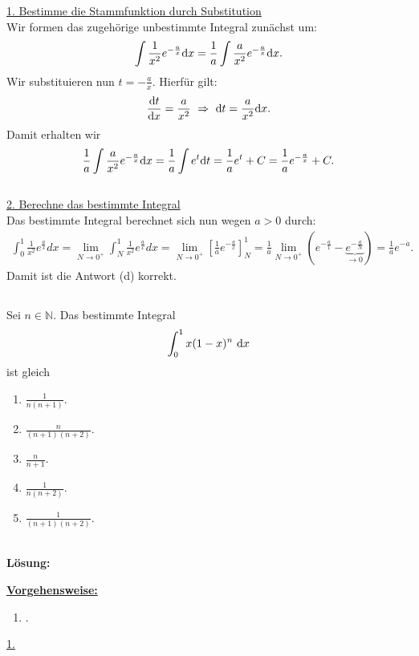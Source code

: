 \underline{1. Bestimme die Stammfunktion durch Substitution}\\
Wir formen das zugehörige unbestimmte Integral zunächst um:
\begin{align*}
	\int \frac{1}{x^2} e^{-\frac{a}{x}} \text{\rmfamily d} x
	=
	\frac{1}{a} \int \frac{a}{x^2} e^{-\frac{a}{x}} \text{\rmfamily d} x.
\end{align*}
Wir substituieren nun $ t = -\frac{a}{x} $. Hierfür gilt:
\begin{align*}
	\frac{\td{t}}{\td{x}} = \frac{a}{x^2} \ \Rightarrow
	\ 
	\td{t} =\frac{a}{x^2} \td{x} .
\end{align*}
Damit erhalten wir
\begin{align*}
	\frac{1}{a} \int \frac{a}{x^2} e^{-\frac{a}{x}} \text{\rmfamily d} x
	=
	\frac{1}{a} \int e^{t} \text{\rmfamily d} t
	=
	\frac{1}{a} e^t + C
	=
	\frac{1}{a} e^{- \frac{a}{x}} +C.
\end{align*}
\ \\
\underline{2. Berechne das bestimmte Integral}\\
Das bestimmte Integral berechnet sich nun wegen $ a > 0  $ durch:
\begin{align*}
	\int_0^1
	\frac{1}{x^2} e^{\frac{a}{x}} dx
	=
	\lim
	\limits_{N\to 0^+}
	\int_N^1
	\frac{1}{x^2} e^{\frac{a}{x}} dx
	=
	\lim 
	\limits_{N\to 0^+}
	\left[\frac{1}{a} e^{- \frac{a}{x}}\right]_N^1
	=
	\frac{1}{a}
	\lim
	\limits_{N\to 0^+} \left(e^{- \frac{a}{1}}  - \underbrace{e^{- \frac{a}{N}}}_{\to 0}\right)
	=
	\frac{1}{a}  e^{-a}.
\end{align*}
Damit ist die Antwort (d) korrekt.

\newpage
\subsection*{}
Sei $ n \in \mathbb{N} $.
Das bestimmte Integral
\begin{align*}
	\int_0^1
	x(1-x)^n
	\ \text{\rmfamily d} x
\end{align*}
ist gleich
\renewcommand{\labelenumi}{(\alph{enumi})}
\begin{enumerate}
	\item 
	$\frac{1}{n(n+1)}$.
	\item
	$\frac{n}{(n+1)(n+2)}$.
	\item
	$\frac{n}{n+1}$.
	\item
	$\frac{1}{n(n+2)}$.
	\item
	$\frac{1}{(n+1)(n+2)}$.	
\end{enumerate}
\ \\
\textbf{Lösung:}
\begin{mdframed}
\underline{\textbf{Vorgehensweise:}}
\renewcommand{\labelenumi}{\theenumi.}
\begin{enumerate}
\item .
\end{enumerate}
\end{mdframed}
\underline{1. }\\
\newpage

